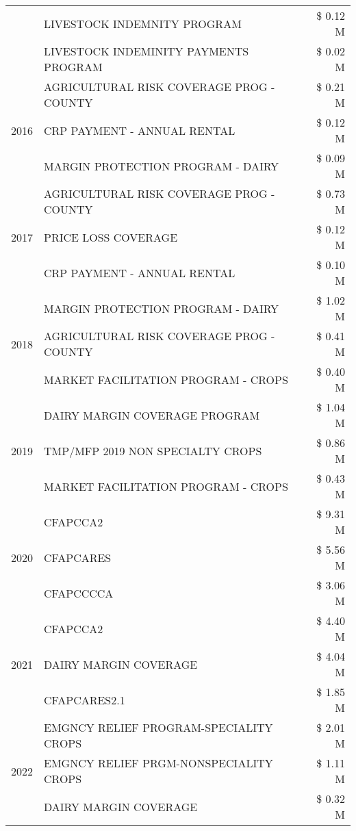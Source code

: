 \begin{tabular}{llr}
 & LIVESTOCK INDEMNITY PROGRAM & \$ 0.12 M \\
 & LIVESTOCK INDEMINITY PAYMENTS PROGRAM & \$ 0.02 M \\
\cline{1-3}
\multirow[t]{3}{*}{2016} & AGRICULTURAL RISK COVERAGE PROG - COUNTY & \$ 0.21 M \\
 & CRP PAYMENT - ANNUAL RENTAL & \$ 0.12 M \\
 & MARGIN PROTECTION PROGRAM - DAIRY & \$ 0.09 M \\
\cline{1-3}
\multirow[t]{3}{*}{2017} & AGRICULTURAL RISK COVERAGE PROG - COUNTY & \$ 0.73 M \\
 & PRICE LOSS COVERAGE & \$ 0.12 M \\
 & CRP PAYMENT - ANNUAL RENTAL & \$ 0.10 M \\
\cline{1-3}
\multirow[t]{3}{*}{2018} & MARGIN PROTECTION PROGRAM - DAIRY & \$ 1.02 M \\
 & AGRICULTURAL RISK COVERAGE PROG - COUNTY & \$ 0.41 M \\
 & MARKET FACILITATION PROGRAM - CROPS & \$ 0.40 M \\
\cline{1-3}
\multirow[t]{3}{*}{2019} & DAIRY MARGIN COVERAGE PROGRAM & \$ 1.04 M \\
 & TMP/MFP 2019 NON SPECIALTY CROPS & \$ 0.86 M \\
 & MARKET FACILITATION PROGRAM - CROPS & \$ 0.43 M \\
\cline{1-3}
\multirow[t]{3}{*}{2020} & CFAPCCA2 & \$ 9.31 M \\
 & CFAPCARES & \$ 5.56 M \\
 & CFAPCCCCA & \$ 3.06 M \\
\cline{1-3}
\multirow[t]{3}{*}{2021} & CFAPCCA2 & \$ 4.40 M \\
 & DAIRY MARGIN COVERAGE & \$ 4.04 M \\
 & CFAPCARES2.1 & \$ 1.85 M \\
\cline{1-3}
\multirow[t]{3}{*}{2022} & EMGNCY RELIEF PROGRAM-SPECIALITY CROPS & \$ 2.01 M \\
 & EMGNCY RELIEF PRGM-NONSPECIALITY CROPS & \$ 1.11 M \\
 & DAIRY MARGIN COVERAGE & \$ 0.32 M \\
\cline{1-3}
\bottomrule
\end{tabular}
